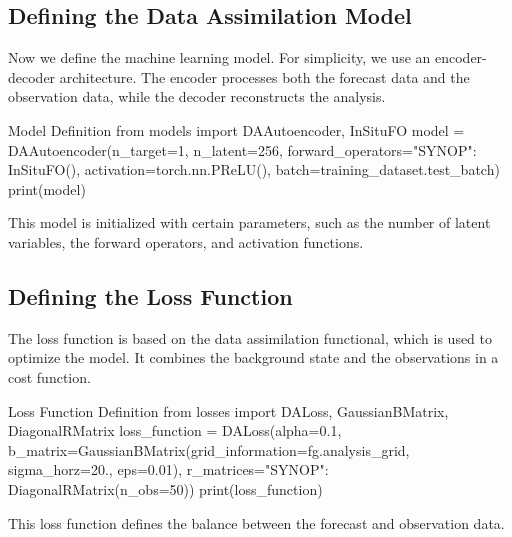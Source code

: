 %
\subsection{Defining the Data Assimilation Model}

Now we define the machine learning model. For simplicity, we use an encoder-decoder architecture. The encoder processes both the forecast data and the observation data, while the decoder reconstructs the analysis.

\begin{codeonly}{Model Definition}
from models import DAAutoencoder, InSituFO
model = DAAutoencoder(n_target=1, n_latent=256, forward_operators={"SYNOP": InSituFO()}, activation=torch.nn.PReLU(), batch=training_dataset.test_batch)
print(model)
\end{codeonly}

This model is initialized with certain parameters, such as the number of latent variables, the forward operators, and activation functions.


\subsection{Defining the Loss Function}

The loss function is based on the data assimilation functional, which is used to optimize the model. It combines the background state and the observations in a cost function.

\begin{codeonly}{Loss Function Definition}
from losses import DALoss, GaussianBMatrix, DiagonalRMatrix
loss_function = DALoss(alpha=0.1, b_matrix=GaussianBMatrix(grid_information=fg.analysis_grid, sigma_horz=20., eps=0.01), r_matrices={"SYNOP": DiagonalRMatrix(n_obs=50)})
print(loss_function)
\end{codeonly}

This loss function defines the balance between the forecast and observation data.


